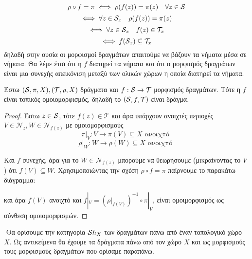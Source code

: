 \begin{remark} $$\rho \circ f = \pi \iff \rho(f(z)) = \pi(z) \quad \forall z \in \mathcal{S}$$
    $$\iff \forall z \in \mathcal{S}_x \quad \rho(f(z)) = \pi(z)$$
    $$\iff \forall z \in \mathcal{S}_x \quad f(z) \in \mathcal{T}_x$$
    $$\iff f(\mathcal{S}_x) \subseteq \mathcal{T}_x$$ δηλαδή στην ουσία οι μορφισμοί δραγμάτων απαιτούμε να βάζουν τα νήματα μέσα σε νήματα. Θα λέμε έτσι ότι η $f$ διατηρεί τα νήματα και ότι ο μορφισμός δραγμάτων είναι μια συνεχής απεικόνιση μεταξύ των ολικών χώρων η οποία διατηρεί τα νήματα.


\end{remark}

\begin{lemma} Έστω $(\mathcal{S}, \pi, X), (\mathcal{T},\rho, X)$ δράγματα και $f: \mathcal{S} \rightarrow \mathcal{T}$ μορφισμός δραγμάτων. Τότε η $f$ είναι τοπικός ομοιομορφισμός, δηλαδή το $(\mathcal{S},f,\mathcal{T})$ είναι δράγμα. 
\end{lemma}

\begin{proof} Έστω $z \in \mathcal{S}$, τότε $f(z) \in \mathcal{T}$ και άρα υπάρχουν ανοιχτές περιοχές $V \in \mathcal{N}_z, W \in \mathcal{N}_{f(z)}$ με ομοιομορφισμούς
    $$\pi|_V : V \longrightarrow \pi(V) \subseteq X \text{ ανοιχτό }$$
    $$\rho|_{W} : W \longrightarrow \rho(W) \subseteq X \text{ ανοιχτό }$$

    Και $f$ συνεχής, άρα για το $W \in \mathcal{N}_{f(z)}$ μπορούμε να θεωρήσουμε (μικραίνοντας το $V$) ότι $f(V) \subseteq W$. Χρησιμοποιώντας την σχέση $\rho \circ f = \pi$ παίρνουμε το παρακάτω διάγραμμα:

    \begin{figure}[H]
        \centering
    \end{figure}
    και άρα $f(V)$ ανοιχτό και $f|_{V} = \left(\rho|_{f(V)}\right)^{-1} \circ \pi|_V$, είναι ομοιμορφισμός ως σύνθεση ομοιομορφισμών.
\end{proof}

$ $\newline
Θα ορίσουμε την κατηγορία $\mathcal{S} h_X$ των δραγμάτων πάνω από έναν τοπολογικό χώρο $X$. Ως αντικείμενα θα έχουμε τα δράγματα πάνω από τον χώρο $X$ και ως μορφισμούς τους μορφισμούς δραγμάτων που ορίσαμε παραπάνω.


